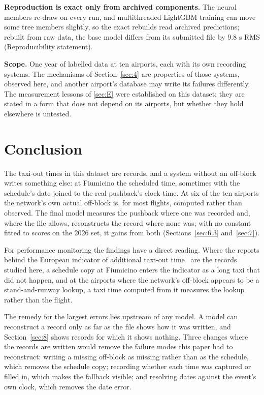 \documentclass[
  manuscript=article,
  layout=preprint,
  year=2026,
  volume=x,
]{extra/joas}
\begin{document}
\textbf{Reproduction is exact only from archived components.} The neural members re-draw on every run, and multithreaded LightGBM training can move some tree members slightly, so the exact rebuilds read archived predictions; rebuilt from raw data, the base model differs from its submitted file by 9.8 s RMS (Reproducibility statement).

\textbf{Scope.} One year of labelled data at ten airports, each with its own recording systems. The mechanisms of Section~\ref{sec:4} are properties of those systems, observed here, and another airport's database may write its failures differently. The measurement lessons of \ref{sec:E} were established on this dataset; they are stated in a form that does not depend on its airports, but whether they hold elsewhere is untested.

\section{Conclusion}\label{sec:9}

The taxi-out times in this dataset are records, and a system without an off-block writes something else: at Fiumicino the scheduled time, sometimes with the schedule's date joined to the real pushback's clock time. At six of the ten airports the network's own actual off-block is, for most flights, computed rather than observed. The final model measures the pushback where one was recorded and, where the file allows, reconstructs the record where none was; with no constant fitted to scores on the 2026 set, it gains from both (Sections~\ref{sec:6.3} and~\ref{sec:7}).

For performance monitoring the findings have a direct reading. Where the reports behind the European indicator of additional taxi-out time~\cite{eurocontrol_atxot2023} are the records studied here, a schedule copy at Fiumicino enters the indicator as a long taxi that did not happen, and at the airports where the network's off-block appears to be a stand-and-runway lookup, a taxi time computed from it measures the lookup rather than the flight.

The remedy for the largest errors lies upstream of any model. A model can reconstruct a record only as far as the file shows how it was written, and Section~\ref{sec:8} shows records for which it shows nothing. Three changes where the records are written would remove the failure modes this paper had to reconstruct: writing a missing off-block as missing rather than as the schedule, which removes the schedule copy; recording whether each time was captured or filled in, which makes the fallback visible; and resolving dates against the event's own clock, which removes the date error.
\end{document}
